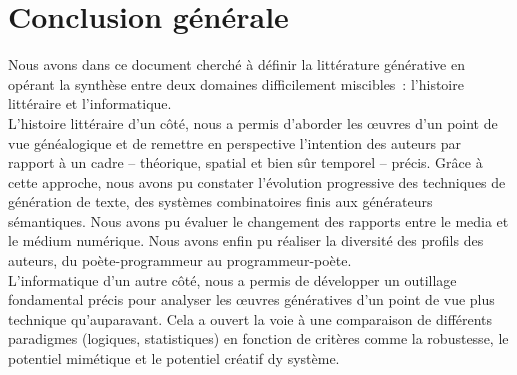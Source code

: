 \documentclass{article}
\begin{document}
		
	
		\newpage
	\section{Conclusion générale}
		Nous avons dans ce document cherché à définir la littérature générative en opérant la synthèse entre deux domaines difficilement miscibles~: l'histoire littéraire et l'informatique.\\
		L'histoire littéraire d'un côté, nous a permis d'aborder les œuvres d'un point de vue généalogique et de remettre en perspective l'intention des auteurs par rapport à un cadre -- théorique, spatial et bien sûr temporel -- précis. Grâce à cette approche, nous avons pu constater l'évolution progressive des techniques de génération de texte, des systèmes combinatoires finis aux générateurs sémantiques. Nous avons pu évaluer le changement des rapports entre le media et le médium numérique. Nous avons enfin pu réaliser la diversité des profils des auteurs, du poète-programmeur au programmeur-poète.\\
		L'informatique d'un autre côté, nous a permis de développer un outillage fondamental précis pour analyser les œuvres génératives d'un point de vue plus technique qu'auparavant. Cela a ouvert la voie à une comparaison de différents paradigmes (logiques, statistiques) en fonction de critères comme la robustesse, le potentiel mimétique et le potentiel créatif dy système.\\
		
\end{document}
